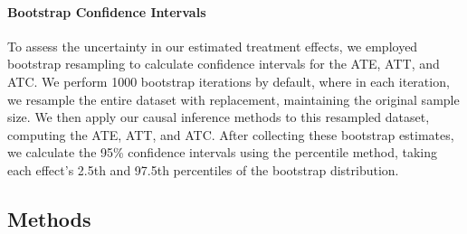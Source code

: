 \documentclass{article}
\begin{document}
\paragraph{Bootstrap Confidence Intervals} To assess the uncertainty in our estimated treatment effects, we employed bootstrap resampling to calculate confidence intervals for the ATE, ATT, and ATC. We perform 1000 bootstrap iterations by default, where in each iteration, we resample the entire dataset with replacement, maintaining the original sample size. We then apply our causal inference methods to this resampled dataset, computing the ATE, ATT, and ATC. After collecting these bootstrap estimates, we calculate the 95\% confidence intervals using the percentile method, taking each effect's 2.5th and 97.5th percentiles of the bootstrap distribution. 

\subsection{Methods}
\end{document}
